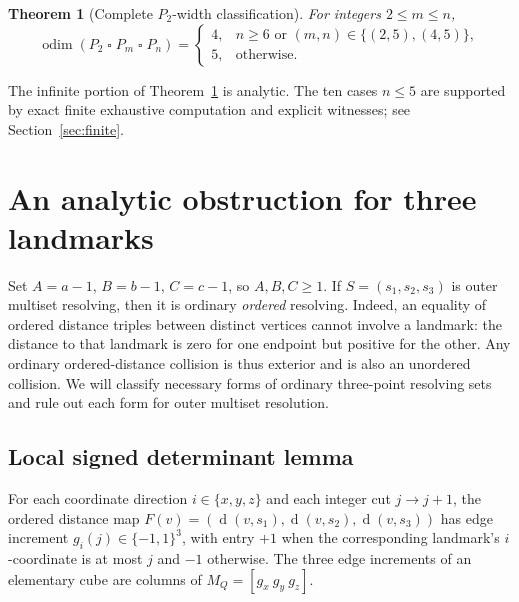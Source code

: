 \documentclass[10pt,a4paper]{article}
\newtheorem{theorem}{Theorem}
\newcommand{\odim}{\operatorname{odim}}
\newcommand{\dm}{\operatorname{d}}
\newcommand{\boxp}{\mathbin{\square}}
\begin{document}
\begin{theorem}[Complete $P_2$-width classification]\label{thm:classification}
For integers $2\le m\le n$,
\[
\odim(P_2\boxp P_m\boxp P_n)=
\begin{cases}
4,& n\ge6\text{ or }(m,n)\in\{(2,5),(4,5)\},\\
5,& \text{otherwise}.
\end{cases}
\]
\end{theorem}
The infinite portion of Theorem~\ref{thm:classification} is analytic. The ten cases $n\le5$ are supported by exact finite exhaustive computation and explicit witnesses; see Section~\ref{sec:finite}.

\section{An analytic obstruction for three landmarks}\label{sec:lower}
Set $A=a-1$, $B=b-1$, $C=c-1$, so $A,B,C\ge1$. If $S=(s_1,s_2,s_3)$ is outer multiset resolving, then it is ordinary \emph{ordered} resolving. Indeed, an equality of ordered distance triples between distinct vertices cannot involve a landmark: the distance to that landmark is zero for one endpoint but positive for the other. Any ordinary ordered-distance collision is thus exterior and is also an unordered collision. We will classify necessary forms of ordinary three-point resolving sets and rule out each form for outer multiset resolution.

\subsection{Local signed determinant lemma}
For each coordinate direction $i\in\{x,y,z\}$ and each integer cut $j\to j+1$, the ordered distance map
$F(v)=(\dm(v,s_1),\dm(v,s_2),\dm(v,s_3))$
has edge increment $g_i(j)\in\{-1,1\}^{3}$, with entry $+1$ when the corresponding landmark's $i$-coordinate is at most $j$ and $-1$ otherwise. The three edge increments of an elementary cube are columns of $M_Q=[g_x\ g_y\ g_z]$.
\end{document}
